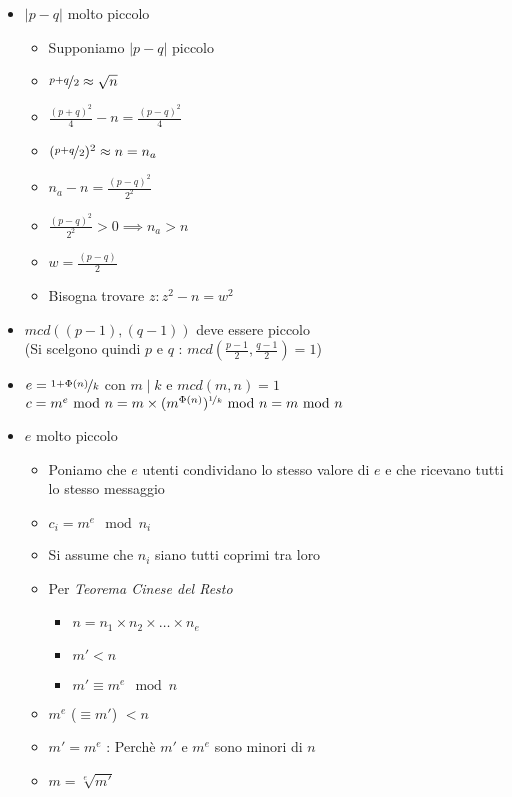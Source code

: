 \begin{itemize}
    \item $|p - q|$ molto piccolo
    \begin{itemize}
        \item Supponiamo $|p-q|$ piccolo
        \item $\nicefrac{p+q}{2} \approx \sqrt{n}$
        \item $\frac{(p+q)^2}{4}-n = \frac{(p-q)^2}{4}$
        \item $(\nicefrac{p+q}{2})^2 \approx n = n_a$
        \item $n_a - n = \frac{(p-q)^2}{2^2}$
        \item $\frac{(p-q)^2}{2^2} > 0 \implies n_a > n$
        \item $w = \frac{(p-q)}{2}$
        \item Bisogna trovare $z : z^2 - n = w^2$
    \end{itemize}
    \item $mcd((p-1), (q-1))$ deve essere piccolo\\(Si scelgono quindi $p$ e $q$ : $mcd(\frac{p-1}{2}, \frac{q-1}{2}) = 1$)
    \item $e = \nicefrac{1 + \Phi(n)}{k}$ con $m \mid k$ e $mcd(m, n) = 1$\\$c = m^e \mod{n} = m \times (m^{\Phi(n)})^{\nicefrac{1}{k}} \mod{n} = m \mod{n}$
    \item $e$ molto piccolo
    \begin{itemize}
        \item Poniamo che $e$ utenti condividano lo stesso valore di $e$ e che ricevano tutti lo stesso messaggio
        \item $c_i = m^e \mod{n_i}$
        \item Si assume che $n_i$ siano tutti coprimi tra loro
        \item Per \textit{Teorema Cinese del Resto}
        \begin{itemize}
            \item $n  = n_1 \times n_2 \times \dots \times n_e$
            \item $m' < n$
            \item $m' \equiv m^e \mod{n}$
        \end{itemize}
        \item $m^e$ {\tiny($\equiv m'$)} $< n$
        \item $m' = m^e$ : Perch\`e $m'$ e $m^e$ sono minori di $n$
        \item $m = \sqrt[e]{m'}$

\end{itemize}
\end{itemize}

